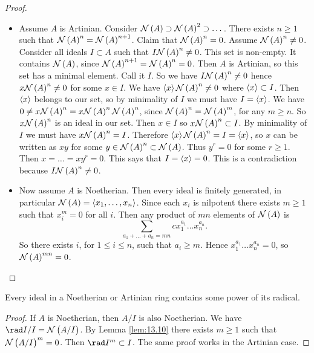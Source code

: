 \begin{proof}
\hfill
\begin{itemize}
\item Assume $ A $ is Artinian. Consider $ \NNN\br{A} \supset \NNN\br{A}^2 \supset \dots $. There exists $ n \ge 1 $ such that $ \NNN\br{A}^n = \NNN\br{A}^{n + 1} $. Claim that $ \NNN\br{A}^n = 0 $. Assume $ \NNN\br{A}^n \ne 0 $. Consider all ideals $ I \subset A $ such that $ I\NNN\br{A}^n \ne 0 $. This set is non-empty. It contains $ \NNN\br{A} $, since $ \NNN\br{A}^{n + 1} = \NNN\br{A}^n = 0 $. Then $ A $ is Artinian, so this set has a minimal element. Call it $ I $. So we have $ I\NNN\br{A}^n \ne 0 $ hence $ x\NNN\br{A}^n \ne 0 $ for some $ x \in I $. We have $ \abr{x}\NNN\br{A}^n \ne 0 $ where $ \left\langle x \right\rangle \subset I $. Then $ \left\langle x \right\rangle $ belongs to our set, so by minimality of $ I $ we must have $ I = \left\langle x \right\rangle $. We have $ 0 \ne x\NNN\br{A}^n = x\NNN\br{A}^n\NNN\br{A}^n $, since $ \NNN\br{A}^n = \NNN\br{A}^m $, for any $ m \ge n $. So $ x\NNN\br{A}^n $ is an ideal in our set. Then $ x \in I $ so $ x\NNN\br{A}^n \subset I $. By minimality of $ I $ we must have $ x\NNN\br{A}^n = I $. Therefore $ \abr{x}\NNN\br{A}^n = I = \abr{x} $, so $ x $ can be written as $ xy $ for some $ y \in \NNN\br{A}^n \subset \NNN\br{A} $. Thus $ y^r = 0 $ for some $ r \ge 1 $. Then $ x = \dots = xy^r = 0 $. This says that $ I = \left\langle x \right\rangle = 0 $. This is a contradiction because $ I\NNN\br{A}^n \ne 0 $.
\item Now assume $ A $ is Noetherian. Then every ideal is finitely generated, in particular $ \NNN\br{A} = \abr{x_1, \dots, x_n} $. Since each $ x_i $ is nilpotent there exists $ m \ge 1 $ such that $ x_i^m = 0 $ for all $ i $. Then any product of $ mn $ elements of $ \NNN\br{A} $ is
$$ \sum_{a_1 + \dots + a_n = mn} cx_1^{a_1} \dots x_n^{a_n}. $$
So there exists $ i $, for $ 1 \le i \le n $, such that $ a_i \ge m $. Hence $ x_1^{a_1} \dots x_n^{a_n} = 0 $, so $ \NNN\br{A}^{mn} = 0 $.
\end{itemize}
\end{proof}

\pagebreak


\begin{corollary}
\label{cor:13.11}
Every ideal in a Noetherian or Artinian ring contains some power of its radical.
\end{corollary}

\begin{proof}
If $ A $ is Noetherian, then $ A / I $ is also Noetherian. We have $ \rad I / I = \NNN\br{A / I} $. By Lemma \ref{lem:13.10} there exists $ m \ge 1 $ such that $ \NNN\br{A / I}^m = 0 $. Then $ \rad I^m \subset I $. The same proof works in the Artinian case.
\end{proof}

